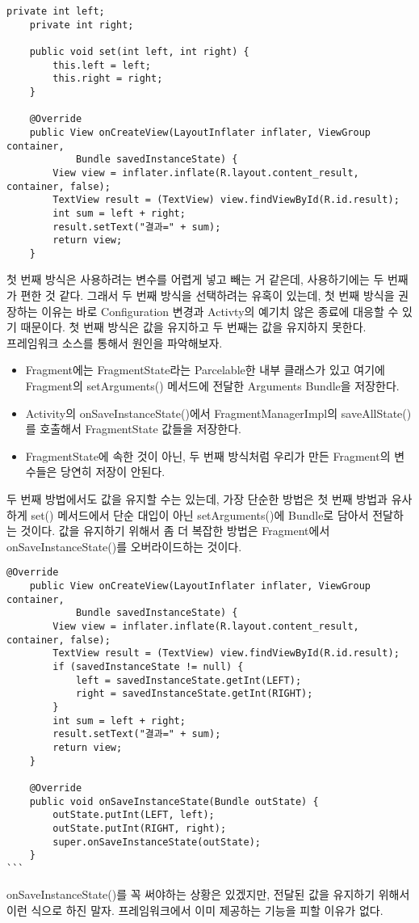 \begin{lstlisting}[frame=single]
    private int left;
    private int right;

    public void set(int left, int right) {
        this.left = left;
        this.right = right;
    }

    @Override
    public View onCreateView(LayoutInflater inflater, ViewGroup container, 
    		Bundle savedInstanceState) {
        View view = inflater.inflate(R.layout.content_result, container, false);
        TextView result = (TextView) view.findViewById(R.id.result);
        int sum = left + right;
        result.setText("결과=" + sum);
        return view;
    }
\end{lstlisting}

첫 번째 방식은 사용하려는 변수를 어렵게 넣고 빼는 거 같은데, 사용하기에는 두 번째가 편한 것 같다.
그래서 두 번째 방식을 선택하려는 유혹이 있는데, 첫 번째 방식을 권장하는 이유는 바로 Configuration 변경과 Activty의 예기치 않은 종료에 대응할 수 있기 때문이다. 첫 번째 방식은 값을 유지하고 두 번째는 값을 유지하지 못한다.\\

프레임워크 소스를 통해서 원인을 파악해보자.
\begin{itemize}
\item Fragment에는 FragmentState라는 Parcelable한 내부 클래스가 있고 여기에 Fragment의 setArguments() 메서드에 전달한 Arguments Bundle을 저장한다.
\item Activity의 onSaveInstanceState()에서 FragmentManagerImpl의 saveAllState()를 호출해서 FragmentState 값들을 저장한다.
\item FragmentState에 속한 것이 아닌, 두 번째 방식처럼 우리가 만든 Fragment의 변수들은 당연히 저장이 안된다.
\end{itemize}

두 번째 방법에서도 값을 유지할 수는 있는데, 가장 단순한 방법은 첫 번째 방법과 유사하게 set() 메서드에서 단순 대입이 아닌 setArguments()에 Bundle로 담아서 전달하는 것이다. 값을 유지하기 위해서 좀 더 복잡한 방법은 Fragment에서 onSaveInstanceState()를 오버라이드하는 것이다.
\begin{lstlisting}[frame=single]
    @Override
    public View onCreateView(LayoutInflater inflater, ViewGroup container, 
    		Bundle savedInstanceState) {
        View view = inflater.inflate(R.layout.content_result, container, false);
        TextView result = (TextView) view.findViewById(R.id.result);
        if (savedInstanceState != null) {
            left = savedInstanceState.getInt(LEFT);
            right = savedInstanceState.getInt(RIGHT);
        }
        int sum = left + right;
        result.setText("결과=" + sum);
        return view;
    }

    @Override
    public void onSaveInstanceState(Bundle outState) {
        outState.putInt(LEFT, left);
        outState.putInt(RIGHT, right);
        super.onSaveInstanceState(outState);
    }
```
\end{lstlisting}
onSaveInstanceState()를 꼭 써야하는 상황은 있겠지만, 전달된 값을 유지하기 위해서 이런 식으로 하진 말자. 프레임워크에서 이미 제공하는 기능을 피할 이유가 없다.\\

